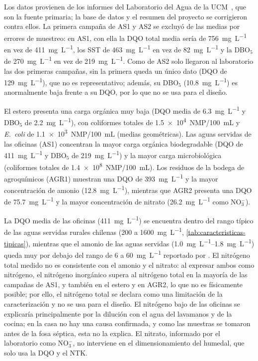 Los datos provienen de los informes del Laboratorio del Agua de la UCM~\parencite{labucm2026informes}, que son la fuente primaria; la base de datos y el resumen del proyecto se corrigieron contra ellos.
La primera campaña de AS1 y AS2 se excluyó de las medias por errores de muestreo: en AS1, con ella la DQO total media sería de \qty{756}{\milli\gram\per\liter} en vez de \qty{411}{\milli\gram\per\liter}, los SST de \qty{463}{\milli\gram\per\liter} en vez de \qty{82}{\milli\gram\per\liter} y la DBO$_5$ de \qty{270}{\milli\gram\per\liter} en vez de \qty{219}{\milli\gram\per\liter}.
Como de AS2 solo llegaron al laboratorio las dos primeras campañas, sin la primera queda un único dato (DQO de \qty{129}{\milli\gram\per\liter}), que no es representativo; además, su DBO$_5$ (\qty{10.8}{\milli\gram\per\liter}) es anormalmente baja frente a su DQO, por lo que no se usa para el diseño.

El estero presenta una carga orgánica muy baja (DQO media de \qty{6.3}{\milli\gram\per\liter} y DBO$_5$ de \qty{2.2}{\milli\gram\per\liter}), con coliformes totales de \num{1.5e4}~NMP/\qty{100}{\milli\liter} y \textit{E.~coli} de \num{1.1e3}~NMP/\qty{100}{\milli\liter} (medias geométricas).
Las aguas servidas de las oficinas (AS1) concentran la mayor carga orgánica biodegradable (DQO de \qty{411}{\milli\gram\per\liter} y DBO$_5$ de \qty{219}{\milli\gram\per\liter}) y la mayor carga microbiológica (coliformes totales de \num{1.4e8}~NMP/\qty{100}{\milli\liter}).
Los residuos de la bodega de agroquímicos (AGR1) muestran una DQO de \qty{393}{\milli\gram\per\liter} y la mayor concentración de amonio (\qty{12.8}{\milli\gram\per\liter}), mientras que AGR2 presenta una DQO de \qty{75.7}{\milli\gram\per\liter} y la mayor concentración de nitrato (\qty{26.2}{\milli\gram\per\liter} como NO$_3^-$).

La DQO media de las oficinas (\qty{411}{\milli\gram\per\liter}) se encuentra dentro del rango típico de las aguas servidas rurales chilenas (200 a \qty{1600}{\milli\gram\per\liter}, \cref{tab:caracteristicas-tipicas}), mientras que el amonio de las aguas servidas (\qtyrange{1.0}{1.8}{\milli\gram\per\liter}) queda muy por debajo del rango de 6 a \qty{60}{\milli\gram\per\liter} reportado por \textcite{araya2014aguas}.
El nitrógeno total medido no es consistente con el amonio y el nitrato: al expresar ambos como nitrógeno, el nitrógeno inorgánico supera al nitrógeno total en la mayoría de las campañas de AS1, y también en el estero y en AGR2, lo que no es físicamente posible; por ello, el nitrógeno total se declara como una limitación de la caracterización y no se usa para el diseño.
El nitrógeno bajo de las oficinas se explicaría principalmente por la dilución con el agua del lavamanos y de la cocina; en la casa no hay una causa confirmada, y como las muestras se tomaron antes de la fosa séptica, esta no la explica.
El nitrato, informado por el laboratorio como NO$_3^-$, no interviene en el dimensionamiento del humedal, que solo usa la DQO y el NTK.

